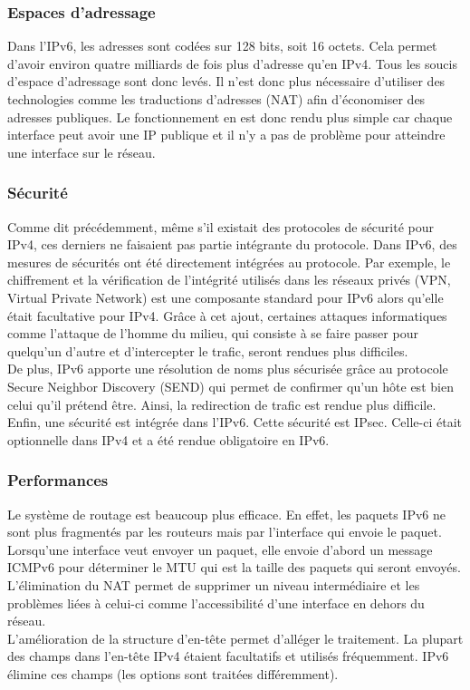 \subsubsection{Espaces d'adressage}
Dans l'IPv6, les adresses sont codées sur 128 bits, soit 16 octets. Cela permet d'avoir 
environ quatre milliards de fois plus d'adresse qu'en IPv4. Tous les soucis d'espace d'adressage sont donc levés. Il n'est donc plus nécessaire d'utiliser des technologies comme les traductions d'adresses
(NAT) afin d'économiser des adresses publiques. Le fonctionnement en est donc rendu plus simple car 
chaque interface peut avoir une IP publique et il n'y a pas de problème pour atteindre une interface sur le réseau.
\subsubsection{Sécurité}
Comme dit précédemment, même s'il existait des protocoles de sécurité pour IPv4, 
ces derniers ne faisaient pas partie intégrante du protocole.
Dans IPv6, des mesures de sécurités ont été directement intégrées au protocole.
Par exemple, le chiffrement et la vérification de l'intégrité utilisés dans les réseaux privés 
(VPN, Virtual Private Network) est une composante standard pour IPv6 alors qu'elle était 
facultative pour IPv4. Grâce à cet ajout, certaines attaques informatiques comme l'attaque de 
l'homme du milieu, qui consiste à se faire passer pour quelqu'un d'autre et d'intercepter 
le trafic, seront rendues plus difficiles.
\\
De plus, IPv6 apporte une résolution de noms plus sécurisée grâce au protocole Secure Neighbor
Discovery (SEND) qui permet de confirmer qu'un hôte est bien celui qu'il prétend être. Ainsi, la redirection de trafic est rendue plus difficile.
\\
Enfin, une sécurité est intégrée dans l'IPv6. Cette sécurité est IPsec. Celle-ci était optionnelle 
dans IPv4 et a été rendue obligatoire en IPv6.
\subsubsection{Performances}

Le système de routage est beaucoup plus efficace. En effet, les paquets IPv6 ne sont plus
fragmentés par les routeurs mais par l'interface qui envoie le paquet. Lorsqu'une interface
veut envoyer un paquet, elle envoie d'abord un message ICMPv6 pour déterminer le MTU qui est 
la taille des paquets qui seront envoyés.
\\
L'élimination du NAT permet de supprimer un niveau intermédiaire et les problèmes liées à celui-ci
 comme l'accessibilité d'une interface en dehors du réseau.
\\	
L'amélioration de la structure d'en-tête permet d'alléger le traitement. La
plupart des champs dans l'en-tête IPv4 étaient facultatifs et utilisés
fréquemment. IPv6 élimine ces champs (les options sont traitées différemment).
